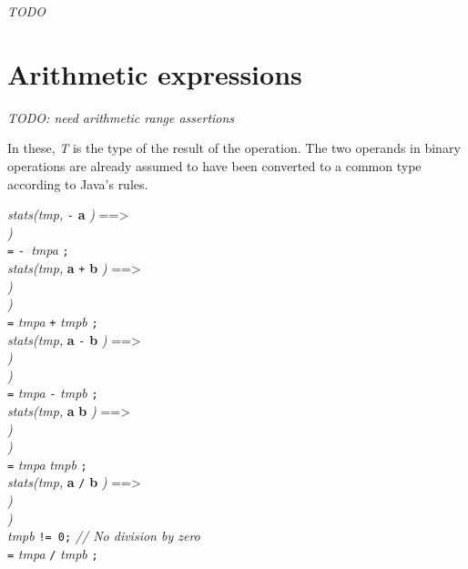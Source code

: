 {\em TODO}

\section{Arithmetic expressions}
{\em TODO: need arithmetic range assertions}

In these, {\em T} is the type of the result of the operation. The two operands in binary operations are already assumed to have been converted to a common type according to Java's rules.

\noindent
{\em stats(tmp, }{\tt -} {\bf a} {\em )} ==> \\
 {\em )} \\
 {\tt =} {\tt - }{\em tmpa} {\tt ;} \\

\noindent
{\em stats(tmp, }{\bf a} {\tt +} {\bf b} {\em )} ==> \\
 {\em )} \\
 {\em )} \\
 {\tt =} {\em tmpa} {\tt +} {\em tmpb} {\tt ;} \\

\noindent
{\em stats(tmp, }{\bf a} {\tt -} {\bf b} {\em )} ==> \\
 {\em )} \\
 {\em )} \\
 {\tt =} {\em tmpa} {\tt -} {\em tmpb} {\tt ;}\\

\noindent
{\em stats(tmp, }{\bf a} {\tt *} {\bf b} {\em )} ==> \\
 {\em )} \\
 {\em )} \\
 {\tt =} {\em tmpa} {\tt *} {\em tmpb} {\tt ;}\\

\noindent
{\em stats(tmp, }{\bf a} {\tt /} {\bf b} {\em )} ==> \\
 {\em )} \\
 {\em )} \\
 {\em tmpb} {\tt != 0;} {\em // No division by zero}\\
 {\tt =} {\em tmpa} {\tt /} {\em tmpb} {\tt ;}\\

